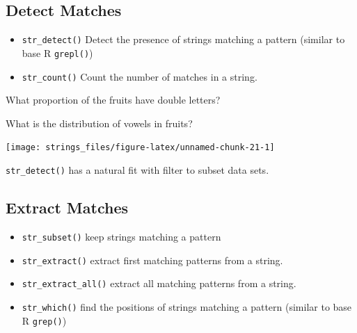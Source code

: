\documentclass[]{book}
\newenvironment{Shaded}{\begin{snugshade}}{\end{snugshade}}
\newcommand{\KeywordTok}[1]{\textcolor[rgb]{0.13,0.29,0.53}{\textbf{#1}}}
\newcommand{\CharTok}[1]{\textcolor[rgb]{0.31,0.60,0.02}{#1}}
\newcommand{\StringTok}[1]{\textcolor[rgb]{0.31,0.60,0.02}{#1}}
\newcommand{\CommentTok}[1]{\textcolor[rgb]{0.56,0.35,0.01}{\textit{#1}}}
\newcommand{\OperatorTok}[1]{\textcolor[rgb]{0.81,0.36,0.00}{\textbf{#1}}}
\newcommand{\NormalTok}[1]{#1}
\providecommand{\tightlist}{%
  \setlength{\itemsep}{0pt}\setlength{\parskip}{0pt}}
\let\BeginKnitrBlock\begin \let\EndKnitrBlock\end
\begin{document}
\subsection{Detect Matches}\label{detect-matches}

\begin{itemize}
\tightlist
\item
  \texttt{str\_detect()} Detect the presence of strings matching a
  pattern (similar to base R \texttt{grepl()})
\item
  \texttt{str\_count()} Count the number of matches in a string.
\end{itemize}

What proportion of the fruits have double letters?

\begin{Shaded}
\end{Shaded}

What is the distribution of vowels in fruits?

\begin{Shaded}
\end{Shaded}

\begin{center}\texttt{[image: strings\_files/figure-latex/unnamed-chunk-21-1]} \end{center}

\BeginKnitrBlock{rmdtip}
\texttt{str\_detect()} has a natural fit with filter to subset data
sets.
\EndKnitrBlock{rmdtip}

\subsection{Extract Matches}\label{extract-matches}

\begin{itemize}
\tightlist
\item
  \texttt{str\_subset()} keep strings matching a pattern
\item
  \texttt{str\_extract()} extract first matching patterns from a string.
\item
  \texttt{str\_extract\_all()} extract all matching patterns from a
  string.
\item
  \texttt{str\_which()} find the positions of strings matching a pattern
  (similar to base R \texttt{grep()})
\end{itemize}
\end{document}
